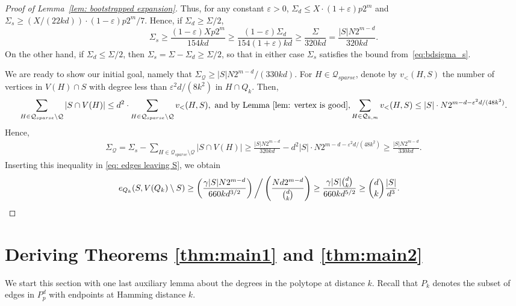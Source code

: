 \documentclass{article}
\theoremstyle{definition}
\newcommand{\eps}{\varepsilon}
\newcommand{\cQ}{\mathcal{Q}}
\begin{document}
\begin{proof}[Proof of Lemma~\ref{lem: bootstrapped expansion}]
Thus, for any constant $\eps>0$, $\Sigma_d\le X\cdot (1+\varepsilon)p2^m$ and $\Sigma_s\ge (X/(22kd))\cdot (1-\varepsilon)p2^m/7$.
Hence, if $\Sigma_d\geq \Sigma/2$, 
\begin{equation}\label{eq:bdsigma_s}
\Sigma_s\ge \frac{(1-\eps)Xp2^m}{154kd}\ge \frac{(1-\eps)\Sigma_d}{154(1+\eps)kd}\ge \frac{\Sigma}{320kd}= \frac{|S| N 2^{m-d}}{320kd}.
\end{equation}
On the other hand, if $\Sigma_d\le \Sigma/2$, then $\Sigma_s= \Sigma-\Sigma_d\ge \Sigma/2$, so that in either case $\Sigma_s$ satisfies the bound from~\eqref{eq:bdsigma_s}.

We are ready to show our initial goal, namely that $\Sigma_{\cQ}\geq |S| N2^{m-d}/(330kd)$. For $H\in\cQ_{sparse}$, denote by $v_<(H,S)$ the number of vertices in $V(H)\cap S$ with degree less than $\varepsilon^2d/(8k^2)$ in $H\cap Q_k$. 
Then,
\[\sum_{H\in\cQ_{sparse}\setminus\cQ}|S\cap V(H)| \leq d^2\cdot \sum_{H\in\cQ_{sparse}\setminus\cQ}v_<(H,S), \text{ and by Lemma~\ref{lem: vertex is good},} \sum_{H\in\cQ_{k,m}}v_<(H,S)\leq |S|\cdot N2^{m-d-\varepsilon^2d/(48k^2)}.\] 
Hence, 
\begin{align*}
\Sigma_{\cQ} = \Sigma_s - \sum_{H\in \cQ_{sparse}\setminus \cQ}|S\cap V(H)|\geq \frac{|S| N 2^{m-d}}{320kd}-d^2|S|\cdot N2^{m-d-\varepsilon^2d/(48k^2)}\geq \frac{|S| N 2^{m-d}}{330kd}.
\end{align*}
Inserting this inequality in \eqref{eq: edges leaving S}, we obtain
\begin{align*}
    e_{Q_k}(S,V(Q_k)\setminus S)\geq \left(\frac{\gamma |S| N 2^{m-d}}{660kd^{3/2}}\right)\bigg/\left(\frac{Nd2^{m-d}}{\tbinom{d}{k}}\right)\geq \frac{\gamma|S| \tbinom{d}{k}}{660k d^{5/2}}\geq \binom{d}{k} \frac{|S|}{d^3}.&\qedhere
\end{align*}
\end{proof}

\section{Deriving Theorems \ref{thm:main1} and \ref{thm:main2}}\label{sec: proof of Theorems}

We start this section with one last auxiliary lemma about the degrees in the polytope at distance $k$. 
Recall that $P_k$ denotes the subset of edges in $P^d_p$ with endpoints at Hamming distance $k$.
\end{document}

